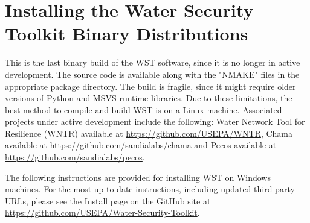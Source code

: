\section{Installing the Water Security Toolkit Binary Distributions}\label{sec.WSTinstall}

This is the last binary build of the WST software, since it is no longer in active development. The source code is available along with the "NMAKE" files in the appropriate package directory. The build is fragile, since it might require older versions of Python and MSVS runtime libraries. Due to these limitations, the best method to compile and build WST is on a Linux machine. Associated projects under active development include the following: Water Network Tool for Resilience (WNTR) available at \url{https://github.com/USEPA/WNTR}, Chama available at \url{https://github.com/sandialabs/chama} and Pecos available at \url{https://github.com/sandialabs/pecos}.

The following instructions are provided for installing WST on Windows machines.
For the most up-to-date instructions, including updated third-party URLs, please see the Install page on the GitHub site at \url{https://github.com/USEPA/Water-Security-Toolkit}.

